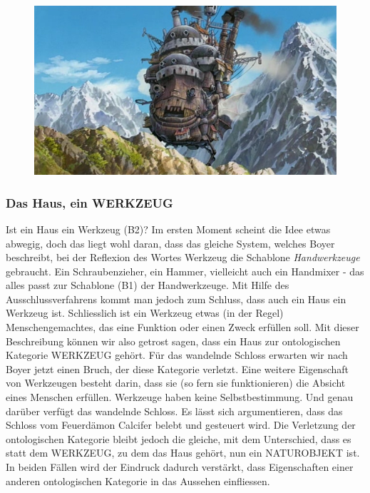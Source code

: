 \begin{figure}
  \centering
  \includegraphics[width=.8\linewidth]{images/00-36-10_castle.png}
  \label{fig:test2}
\end{figure}

\subsubsection{Das Haus, ein WERKZEUG} 
Ist ein Haus ein Werkzeug (B2)? Im ersten Moment scheint die Idee etwas abwegig, doch das liegt wohl daran, dass das gleiche System, welches Boyer beschreibt, bei der Reflexion des Wortes Werkzeug die Schablone \emph{Hand\-werkzeuge} gebraucht. Ein Schraubenzieher, ein Hammer, vielleicht auch ein Handmixer - das alles passt zur Schablone (B1) der Hand\-werkzeuge. Mit Hilfe des Ausschlussverfahrens kommt man jedoch zum Schluss, dass auch ein Haus ein Werkzeug ist. Schliesslich ist ein Werkzeug etwas (in der Regel) Menschengemachtes, das eine Funktion oder einen Zweck erfüllen soll. Mit dieser Beschreibung können wir also getrost sagen, dass ein Haus zur ontologischen Kategorie WERKZEUG gehört. Für das wandelnde Schloss erwarten wir nach Boyer jetzt einen Bruch, der diese Kategorie verletzt. Eine weitere Eigenschaft von Werkzeugen besteht darin, dass sie (so fern sie funktionieren) die Absicht eines Menschen erfüllen. Werkzeuge haben keine Selbstbestimmung. Und genau darüber verfügt das wandelnde Schloss. Es lässt sich argumentieren, dass das Schloss vom Feuerdämon Calcifer belebt und gesteuert wird. Die Verletzung der ontologischen Kategorie bleibt jedoch die gleiche, mit dem Unterschied, dass es statt dem WERKZEUG, zu dem das Haus gehört, nun ein NATUROBJEKT ist. In beiden Fällen wird der Eindruck dadurch verstärkt, dass Eigenschaften einer anderen ontologischen Kategorie in das Aussehen einfliessen. 

